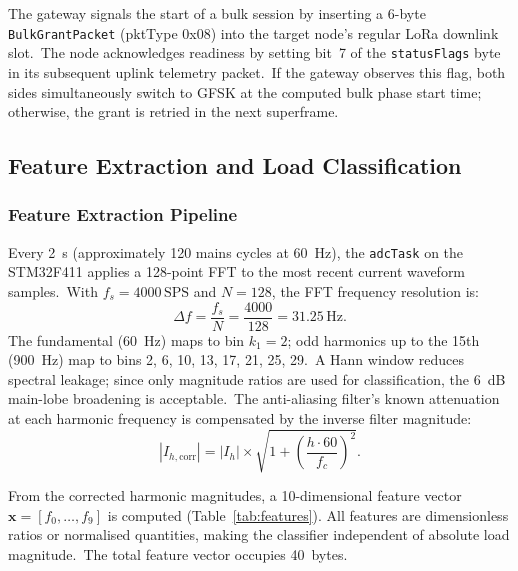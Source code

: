 \documentclass[conference]{IEEEtran}
\begin{document}
The gateway signals the start of a bulk session by inserting a
6-byte \texttt{BulkGrantPacket} (pktType 0x08) into the target node's
regular LoRa downlink slot.\ The node acknowledges readiness by
setting bit~7 of the \texttt{statusFlags} byte in its subsequent
uplink telemetry packet.\ If the gateway observes this flag, both
sides simultaneously switch to GFSK at the computed bulk phase start
time; otherwise, the grant is retried in the next superframe.

\subsection{Feature Extraction and Load Classification}
\label{ssec:classifier}

\subsubsection{Feature Extraction Pipeline}

Every 2~s (approximately 120 mains cycles at 60~Hz), the
\texttt{adcTask} on the STM32F411 applies a 128-point FFT to the most
recent current waveform samples.\ With \(f_s = 4000\,\text{SPS}\) and
\(N = 128\), the FFT frequency resolution is:
\begin{equation}
  \Delta f = \frac{f_s}{N} = \frac{4000}{128} = 31.25\,\text{Hz}.
  \label{eq:fft_res}
\end{equation}
The fundamental (60~Hz) maps to bin \(k_1 = 2\); odd harmonics up to
the 15th (900~Hz) map to bins 2, 6, 10, 13, 17, 21, 25, 29.\ A Hann
window reduces spectral leakage; since only magnitude ratios are used
for classification, the 6~dB main-lobe broadening is acceptable.\ The
anti-aliasing filter's known attenuation at each harmonic frequency is
compensated by the inverse filter magnitude:
\begin{equation}
  |I_{h,\text{corr}}| = |I_h| \times \sqrt{1 + \left(\frac{h \cdot 60}{f_c}\right)^2}.
  \label{eq:filt_correction}
\end{equation}

From the corrected harmonic magnitudes, a 10-dimensional feature vector
\(\mathbf{x} = [f_0, \ldots, f_9]\) is computed (Table~\ref{tab:features}).
All features are dimensionless ratios or normalised quantities, making
the classifier independent of absolute load magnitude.\ The total feature
vector occupies 40~bytes.
\end{document}
